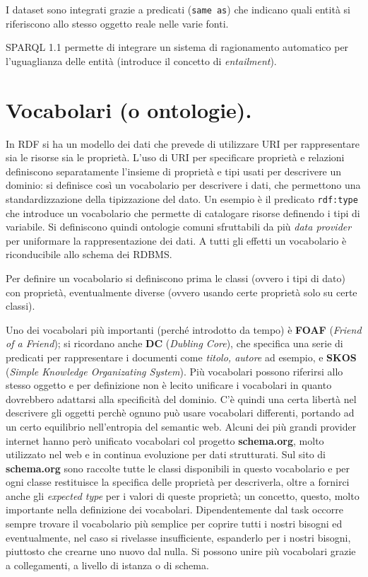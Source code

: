 \documentclass[11pt]{article}
\begin{document}
I dataset sono integrati grazie a predicati (\verb|same as|) che indicano quali entità si riferiscono allo stesso oggetto reale nelle varie fonti.

SPARQL 1.1 permette di integrare un sistema di ragionamento automatico per l'uguaglianza delle entità (introduce il concetto di \textit{entailment}).

\section{Vocabolari (o ontologie).}
In RDF si ha un modello dei dati che prevede di utilizzare URI per rappresentare sia le risorse sia le proprietà.
L'uso di URI per specificare proprietà e relazioni definiscono separatamente l'insieme di proprietà e tipi usati per descrivere un dominio: si definisce così un vocabolario per descrivere i dati, che permettono una standardizzazione della tipizzazione del dato.
Un esempio è il predicato \verb|rdf:type| che introduce un vocabolario che permette di catalogare risorse definendo i tipi di variabile.
Si definiscono quindi ontologie comuni sfruttabili da più \textit{data provider} per uniformare la rappresentazione dei dati. A tutti gli effetti un vocabolario è riconducibile allo schema dei RDBMS.

Per definire un vocabolario si definiscono prima le classi (ovvero i tipi di dato) con proprietà, eventualmente diverse (ovvero usando certe proprietà solo su certe classi).

Uno dei vocabolari più importanti (perché introdotto da tempo) è \textbf{FOAF} (\textit{Friend of a Friend}); si ricordano anche \textbf{DC} (\textit{Dubling Core}), che specifica una serie di predicati per rappresentare i documenti come \textit{titolo, autore} ad esempio, e \textbf{SKOS} (\textit{Simple Knowledge Organizating System}).
Più vocabolari possono riferirsi allo stesso oggetto e per definizione non è lecito unificare i vocabolari in quanto dovrebbero adattarsi alla specificità del dominio. C'è quindi una certa libertà nel descrivere gli oggetti perchè ognuno può usare vocabolari differenti, portando ad un certo equilibrio nell'entropia del semantic web.
Alcuni dei più grandi provider internet hanno però unificato vocabolari col progetto \textbf{schema.org}, molto utilizzato nel web e in continua evoluzione per dati strutturati. Sul sito di \textbf{schema.org} sono raccolte tutte le classi disponibili in questo vocabolario e per ogni classe restituisce la specifica delle proprietà per descriverla, oltre a fornirci anche gli \textit{expected type} per i valori di queste proprietà; un concetto, questo, molto importante nella definizione dei vocabolari. 
Dipendentemente dal task occorre sempre trovare il vocabolario più semplice per coprire tutti i nostri bisogni ed eventualmente, nel caso si rivelasse insufficiente, espanderlo per i nostri bisogni, piuttosto che crearne uno nuovo dal nulla.
Si possono unire più vocabolari grazie a collegamenti, a livello di istanza o di schema.
\end{document}

